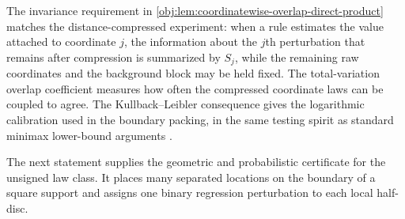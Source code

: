 \documentclass[11pt]{article}
\begin{document}
The invariance requirement in \cref{obj:lem:coordinatewise-overlap-direct-product} matches the distance-compressed experiment: when a rule estimates the value attached to coordinate \(j\), the information about the \(j\)th perturbation that remains after compression is summarized by \(S_j\), while the remaining raw coordinates and the background block may be held fixed. The total-variation overlap coefficient measures how often the compressed coordinate laws can be coupled to agree. The Kullback--Leibler consequence gives the logarithmic calibration used in the boundary packing, in the same testing spirit as standard minimax lower-bound arguments \citep{Stone1982,Tsybakov2009}.

The next statement supplies the geometric and probabilistic certificate for the unsigned law class. It places many separated locations on the boundary of a square support and assigns one binary regression perturbation to each local half-disc.
\end{document}
